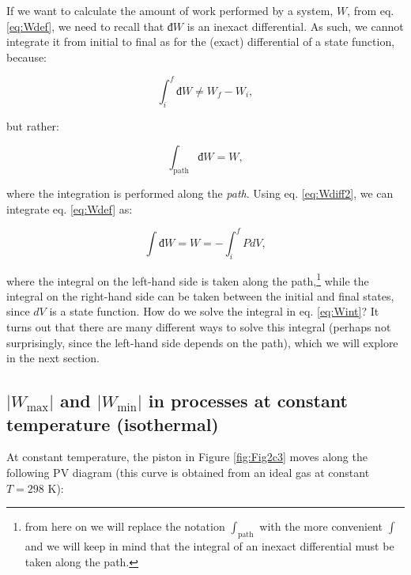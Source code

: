 \documentclass[
  9pt,
]{extbook}
\theoremstyle{definition}
\theoremstyle{definition}
\theoremstyle{definition}
\theoremstyle{remark}
\begin{document}
If we want to calculate the amount of work performed by a system, \(W\), from eq. \eqref{eq:Wdef}, we need to recall that \(đ W\) is an inexact differential. As such, we cannot integrate it from initial to final as for the (exact) differential of a state function, because:

\begin{equation}
  \int_{i}^{f}đ W \neq W_f - W_i,
  \label{eq:Wdiff}
\end{equation}

but rather:

\begin{equation}
  \int_{\text{path}} đ W = W,
  \label{eq:Wdiff2}
\end{equation}

where the integration is performed along the \emph{path}. Using eq. \eqref{eq:Wdiff2}, we can integrate eq. \eqref{eq:Wdef} as:

\begin{equation}
  \int đ W = W = - \int_{i}^{f} PdV,
  \label{eq:Wint}
\end{equation}

where the integral on the left-hand side is taken along the path,\footnote{from here on we will replace the notation \(\int_{\text{path}}\) with the more convenient \(\int\) and we will keep in mind that the integral of an inexact differential must be taken along the path.} while the integral on the right-hand side can be taken between the initial and final states, since \(dV\) is a state function.
How do we solve the integral in eq. \eqref{eq:Wint}? It turns out that there are many different ways to solve this integral (perhaps not surprisingly, since the left-hand side depends on the path), which we will explore in the next section.

\hypertarget{w_textmax-and-w_textmin-in-processes-at-constant-temperature-isothermal}{%
\subsection{\texorpdfstring{\(| W_{\text{max}} |\) and \(| W_{\text{min}} |\) in processes at constant temperature (isothermal)}{\textbar{} W\_\{\textbackslash text\{max\}\} \textbar{} and \textbar{} W\_\{\textbackslash text\{min\}\} \textbar{} in processes at constant temperature (isothermal)}}\label{w_textmax-and-w_textmin-in-processes-at-constant-temperature-isothermal}}

At constant temperature, the piston in Figure \ref{fig:Fig2c3} moves along the following PV diagram (this curve is obtained from an ideal gas at constant \(T=298\) K):
\end{document}
